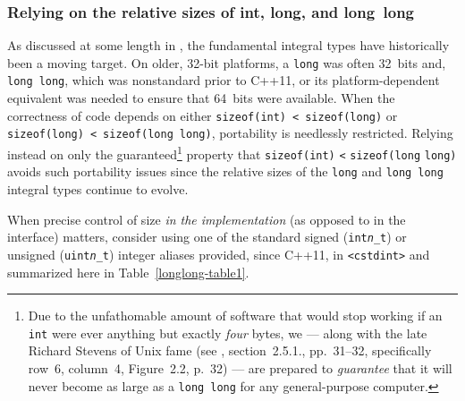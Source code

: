 \subsubsection[Relying on the relative sizes of \lstinline!int!, \lstinline!long!, and \lstinline!long!~\lstinline!long!]{Relying on the relative sizes of {\SubsubsecCode int}, {\SubsubsecCode long}, and {\SubsubsecCode long}~{\SubsubsecCode long}}\label{relying-on-the-relative-sizes-of-int,-long,-and-long-long}

As discussed at some length in ,
the
fundamental integral types have historically been a moving target. On
older, 32-bit platforms, a \lstinline!long! was often 32~bits and, \lstinline!long!~\lstinline!long!, which was nonstandard prior to C++11, or its platform-dependent equivalent was needed to ensure that 64~bits were
available. When the correctness of code depends on either
\lstinline!sizeof(int)!~\lstinline!<!~\lstinline!sizeof(long)! or
\lstinline!sizeof(long)!~\lstinline!<!~\lstinline!sizeof(long!~\lstinline!long)!,
portability is needlessly restricted. Relying instead on only the
guaranteed{\cprotect\footnote{Due to the unfathomable amount of software
that would stop working if an \lstinline!int! were ever anything but
exactly \emph{four} bytes, we --- along with the late Richard Stevens
  of Unix fame (see \cite{stevens93}, section~2.5.1., pp.~31--32, specifically row~6, column~4, Figure~2.2, p.~32) --- are prepared
  to \emph{guarantee} that it will never become as large as a
  \lstinline!long!~\lstinline!long! for any general-purpose computer.}}
property that
\lstinline!sizeof(int)! \lstinline!<! \lstinline!sizeof(long! \lstinline!long)!
avoids such portability issues since the relative sizes of the \lstinline!long! and \lstinline!long!~\lstinline!long! integral
types continue to evolve.

When precise control of size \emph{in the implementation} (as opposed to
in the interface) matters, consider using one of the standard signed
(\texttt{int{\itshape n}\_t}) or unsigned (\texttt{uint{\itshape n}\_t}) integer
aliases provided, since C++11, in \lstinline!<cstdint>! and
summarized here in Table~\ref{longlong-table1}.%


